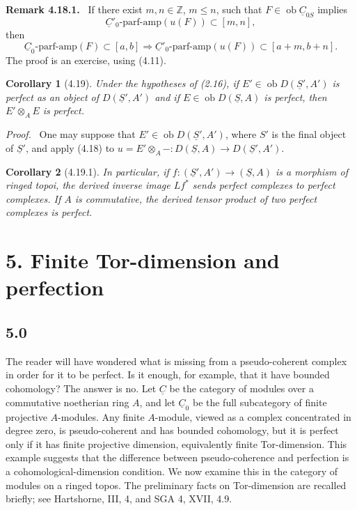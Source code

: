 \documentclass[13pt]{extarticle}
\newcommand{\ZZ}{\mathbb Z}
\newcommand{\uS}{\underline S}
\newcommand{\uC}{\underline C}
\newcommand{\ob}{\operatorname{ob}}
\newenvironment{prooftext}[1][Proof]{\par\noindent\emph{#1.}\ }{\par\medskip}
\newenvironment{remarktext}[1][Remark]{\par\noindent\textbf{#1.}\ }{\par\medskip}
\newtheorem*{corollary*}{Corollary}
\begin{document}
\begin{remarktext}[Remark 4.18.1]
If there exist $m,n\in\ZZ$, $m\leq n$, such that $F\in\ob\uC_{0S}$ implies
\[
\uC'_0\text{-parf-amp}(u(F))\subset[m,n],
\]
then
\[
\uC_0\text{-parf-amp}(F)\subset[a,b]
\Longrightarrow
\uC'_0\text{-parf-amp}(u(F))\subset[a+m,b+n].
\]
The proof is an exercise, using (4.11).
\end{remarktext}

\begin{corollary*}[4.19]
Under the hypotheses of (2.16), if $E'\in\ob D(\uS',A')$ is perfect as an object of $D(\uS',A')$ and if $E\in\ob D(\uS,A)$ is perfect, then $E'\otimes_AE$ is perfect.
\end{corollary*}

\begin{prooftext}
One may suppose that $E'\in\ob D(\uS',A')$, where $S'$ is the final object of $\uS'$, and apply (4.18) to $u=E'\otimes_A-:D(\uS,A)\to D(\uS',A')$.
\end{prooftext}

\begin{corollary*}[4.19.1]
In particular, if $f:(\uS',A')\to(\uS,A)$ is a morphism of ringed topoi, the derived inverse image $Lf^*$ sends perfect complexes to perfect complexes. If $A$ is commutative, the derived tensor product of two perfect complexes is perfect.
\end{corollary*}

\section*{5. Finite Tor-dimension and perfection}

\subsection*{5.0}
The reader will have wondered what is missing from a pseudo-coherent complex in order for it to be perfect. Is it enough, for example, that it have bounded cohomology? The answer is no. Let $\uC$ be the category of modules over a commutative noetherian ring $A$, and let $\uC_0$ be the full subcategory of finite projective $A$-modules. Any finite $A$-module, viewed as a complex concentrated in degree zero, is pseudo-coherent and has bounded cohomology, but it is perfect only if it has finite projective dimension, equivalently finite Tor-dimension. This example suggests that the difference between pseudo-coherence and perfection is a cohomological-dimension condition. We now examine this in the category of modules on a ringed topos. The preliminary facts on Tor-dimension are recalled briefly; see Hartshorne, III, 4, and SGA 4, XVII, 4.9.
\end{document}

